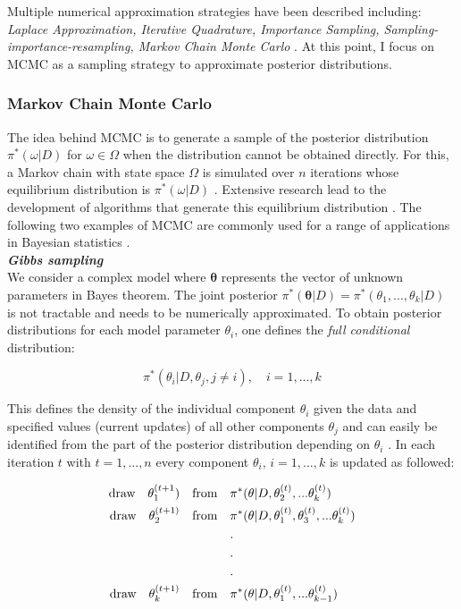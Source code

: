 Multiple numerical approximation strategies have been described including: \emph{Laplace Approximation, Iterative Quadrature, Importance Sampling, Sampling-importance-resampling, Markov Chain Monte Carlo} \citep{Bernardo2000}. At this point, I focus on \gls{MCMC} \citep{Metropolis1953, Hastings1970} as a sampling strategy to approximate posterior distributions.

\subsubsection{Markov Chain Monte Carlo}

The idea behind MCMC is to generate a sample of the posterior distribution $\pi^*(\omega|D)$ for $\omega\in\Omega$ when the distribution cannot be obtained directly. For this, a Markov chain with state space $\Omega$ is simulated over $n$ iterations whose equilibrium distribution is $\pi^*(\omega|D)$ \citep{Bernardo2000}. Extensive research lead to the development of algorithms that generate this equilibrium distribution \citep{Casella1992, Gelfand1990, Greyer1992, Besag1993, Gelman1992}.
The following two examples of MCMC are commonly used for a range of applications in Bayesian statistics \citep{Bernardo2000}.\\

\textbf{\textit{Gibbs sampling}}\\

We consider a complex model where $\bm{\theta}$ represents the vector of unknown parameters in Bayes theorem. The joint posterior $\pi^*(\bm{\theta}|D)=\pi^*(\theta_1,...,\theta_k|D)$ is not tractable and needs to be numerically approximated. To obtain posterior distributions for each model parameter $\theta_i$, one defines the \emph{full conditional} distribution:

\begin{equation}
\pi^*(\theta_i|D,\theta_j,j\neq{}i), \quad i=1,...,k
\end{equation}

This defines the density of the individual component $\theta_i$ given the data and specified values (current updates) of all other components $\theta_j$ \cite{Geman1984} and can easily be identified from the part of the posterior distribution depending on $\theta_i$ \citep{Bernardo2000}. In each iteration $t$ with $t=1,...,n$ every component $\theta_i,\,{}i=1,...,k$ is updated as followed:

\begin{align*}
\textnormal{draw} \quad  \theta_1^{(t+1}) \quad \textnormal{from} \quad & \pi^*(\theta|D, \theta_2^{(t)},...\theta_k^{(t)})\\
\textnormal{draw} \quad  \theta_2^{(t+1)} \quad \textnormal{from} \quad & \pi^*(\theta|D, \theta_1^{(t)},\theta_3^{(t)},...\theta_k^{(t)})\\
&.\\
&.\\
&.\\
\textnormal{draw} \quad  \theta_k^{(t+1)} \quad \textnormal{from}  \quad& \pi^*(\theta|D, \theta_1^{(t)},...\theta_{k-1}^{(t)})
\end{align*}

